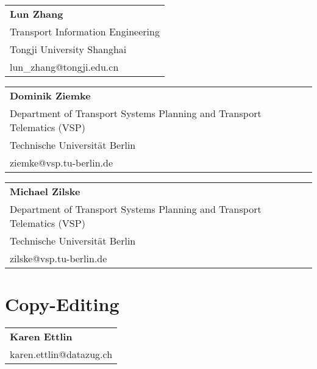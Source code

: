 \begin{tabular}[width=0.48\textwidth]{l}
\textbf{Lun Zhang} \\
Transport Information Engineering \\
Tongji University Shanghai \\
lun\_zhang@tongji.edu.cn \\
\end{tabular}

\begin{tabular}[width=0.48\textwidth]{l}
\textbf{Dominik Ziemke} \\
Department of Transport Systems Planning and Transport Telematics (VSP) \\
Technische Universität Berlin \\
ziemke@vsp.tu-berlin.de \\
\end{tabular}

\begin{tabular}[width=0.48\textwidth]{l}
\textbf{Michael Zilske} \\
Department of Transport Systems Planning and Transport Telematics (VSP) \\
Technische Universität Berlin \\
zilske@vsp.tu-berlin.de \\
\end{tabular}

\section*{Copy-Editing}

\begin{tabular}[width=0.48\textwidth]{l}
\textbf{Karen Ettlin} \\
karen.ettlin@datazug.ch \\
\end{tabular}



